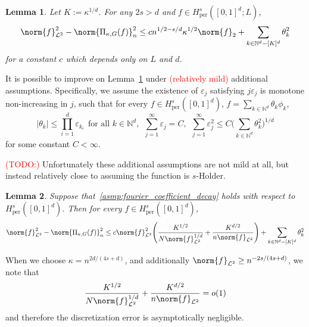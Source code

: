 \documentclass{article}
\newcommand{\abs}[1]{\left \lvert #1 \right \rvert}
\newcommand{\1}{\mathbf{1}}
\newcommand{\Leb}{\mathcal{L}}
\theoremstyle{alden}
\theoremstyle{aldenthm}
\newtheorem{lemma}{Lemma}
\theoremstyle{definition}
\theoremstyle{remark}
\begin{document}
\begin{lemma}
	\label{lem:grid_sobolev_approximation_error}
	Let $K := \kappa^{1/d}$. For any $2s > d$ and $f \in H_{\textrm{per}}^s([0,1]^d;L)$, 
	\begin{equation}
	\label{eqn:grid_sobolev_approximation_error}
	\norm{f}_{\Leb^2}^2 - \norm{\Pi_{\kappa,G}(f)}_{n}^2 \leq c n^{1/2 - s/d} \kappa^{1/2} \norm{f}_2 + \sum_{k \in \mathbb{N}^d - [K]^d} \theta_k^2
	\end{equation}
	for a constant $c$ which depends only on $L$ and $d$. 
\end{lemma}

It is possible to improve on Lemma~\ref{lem:grid_sobolev_approximation_error} under \textcolor{red}{(relatively mild)} additional assumptions. Specifically, we assume the existence of $\varepsilon_j$ satisfying $j \varepsilon_j$ is monotone non-increasing in $j$, such that for every $f \in H_{\textrm{per}}^{s}([0,1]^d)$, $f = \sum_{k \in \mathbb{N}^d} \theta_k \phi_k$,
\begin{equation}
\label{asmp:fourier_coefficient_decay}
\abs{\theta_k} \leq \prod_{i = 1}^{d} \varepsilon_{k_i}~~\textrm{for all $k \in \mathbb{N}^d$},~~ \sum_{j = 1}^{\infty} \varepsilon_j = C,~~ \sum_{j = 1}^{\infty} \varepsilon_j^2 \leq C \biggl(\sum_{k \in \mathbb{N}^d} \theta_k^2\biggr)^{1/d}
\end{equation}
for some constant $C < \infty$. 

\textcolor{red}{(TODO:)} {Unfortunately these additional assumptions are not mild at all, but instead relatively close to assuming the function is $s$-Holder.}

\begin{lemma}
	\label{lem:grid_sobolev_approximation_error_2}
	Suppose that~\eqref{asmp:fourier_coefficient_decay} holds with respect to $H_{\textrm{per}}^{s}([0,1]^d)$. Then for every $f \in H_{\textrm{per}}^{s}([0,1]^d)$,
	\begin{equation}
	\label{eqn:grid_sobolev_approximation_error_2}
	\norm{f}_{\Leb^2}^2 - \norm{\Pi_{\kappa,G}(f)}_{n}^2 \leq c \norm{f}_{\Leb^2}^2 \Biggl( \frac{K^{1/2}}{N \norm{f}_{\Leb^2}^{1/d}} + \frac{K^{d/2}}{n\norm{f}_{\Leb^2}}\Biggr) + \sum_{k \in \mathbb{N}^d - [K]^d} \theta_k^2
	\end{equation}
\end{lemma}
When we choose $\kappa = n^{2d/(4s + d)}$, and additionally $\norm{f}_{\Leb^2} \geq n^{-2s/(4s + d)}$, we note that 
\begin{equation*}
\frac{K^{1/2}}{N \norm{f}_{\Leb^2}^{1/d}} + \frac{K^{d/2}}{n\norm{f}_{\Leb^2}} = o(1)
\end{equation*}
and therefore the discretization error is asymptotically negligible.
\end{document}

